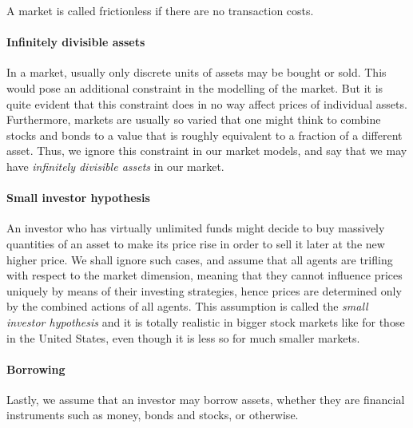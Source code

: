 \begin{dfn}
	A market is called frictionless if there are no transaction costs.
\end{dfn}


\paragraph{Infinitely divisible assets}
In a market, usually only discrete units of assets may be bought or sold. This would pose an additional constraint in the modelling of the market. But it is quite evident that this constraint does in no way affect prices of individual assets. Furthermore, markets are usually so varied that one might think to combine stocks and bonds to a value that is roughly equivalent to a fraction of a different asset. Thus, we ignore this constraint in our market models, and say that we may have \emph{infinitely divisible assets} in our market.


\paragraph{Small investor hypothesis}
An investor who has virtually unlimited funds might decide to buy massively quantities of an asset to make its price rise in order to sell it later at the new higher price. We shall ignore such cases, and assume that all agents are trifling with respect to the market dimension, meaning that they cannot influence prices uniquely by means of their investing strategies, hence prices are determined only by the combined actions of all agents. This assumption is called the \emph{small investor hypothesis} and it is totally realistic in bigger stock markets like for those in the United States, even though it is less so for much smaller markets.


\paragraph{Borrowing}
Lastly, we assume that an investor may borrow assets, whether they are financial instruments such as money, bonds and stocks, or otherwise.


